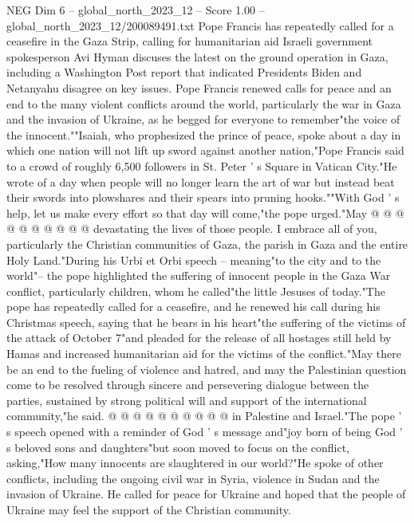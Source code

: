 \begin{textsample}{NEG Dim 6 – global\_north\_2023\_12 – Score 1.00 – global\_north\_2023\_12/200089491.txt}  \label{ex:f6_neg_264}
Pope Francis has repeatedly called for a ceasefire in the Gaza Strip, calling for humanitarian aid Israeli government spokesperson Avi Hyman discuses the latest on the ground operation in Gaza, including a Washington Post report that indicated Presidents Biden and Netanyahu disagree on key issues.
Pope Francis renewed calls for peace and an end to the many violent conflicts around the world, particularly the war in Gaza and the invasion of Ukraine, as he begged for everyone to remember"the voice of the innocent.""Isaiah, who prophesized the prince of peace, spoke about a day in which one nation will not lift up sword against another nation,"Pope Francis said to a crowd of roughly 6,500 followers in St.
Peter ' s Square in Vatican City."He wrote of a day when people will no longer learn the art of war but instead beat their swords into plowshares and their spears into pruning hooks.""With God ' s help, let us make every effort so that day will come,"the pope urged."May @ @ @ @ @ @ @ @ @ @ devastating the lives of those people.
I embrace all of you, particularly the Christian communities of Gaza, the parish in Gaza and the entire Holy Land."During his Urbi et Orbi speech -- meaning"to the city and to the world"-- the pope highlighted the suffering of innocent people in the Gaza War conflict, particularly children, whom he called"the little Jesuses of today."The pope has repeatedly called for a ceasefire, and he renewed his call during his Christmas speech, saying that he bears in his heart"the suffering of the victims of the attack of October 7"and pleaded for the release of all hostages still held by Hamas and increased humanitarian aid for the victims of the conflict."May there be an end to the fueling of violence and hatred, and may the Palestinian question come to be resolved through sincere and persevering dialogue between the parties, sustained by strong political will and support of the international community,"he said. @ @ @ @ @ @ @ @ @ @ in Palestine and Israel."The pope ' s speech opened with a reminder of God ' s message and"joy born of being God ' s beloved sons and daughters"but soon moved to focus on the conflict, asking,"How many innocents are slaughtered in our world?"He spoke of other conflicts, including the ongoing civil war in Syria, violence in Sudan and the invasion of Ukraine.
He called for peace for Ukraine and hoped that the people of Ukraine may feel the support of the Christian community.

\end{textsample}
